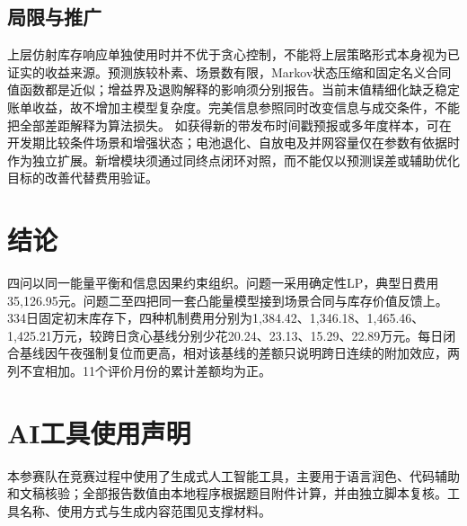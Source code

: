 \documentclass[UTF8,a4paper,zihao=-4,fontset=mac]{ctexart}
\begin{document}
\subsection{局限与推广}
上层仿射库存响应单独使用时并不优于贪心控制，不能将上层策略形式本身视为已证实的收益来源。预测族较朴素、场景数有限，Markov状态压缩和固定名义合同值函数都是近似；增益界及退购解释的影响须分别报告。当前末值精细化缺乏稳定账单收益，故不增加主模型复杂度。完美信息参照同时改变信息与成交条件，不能把全部差距解释为算法损失。
如获得新的带发布时间戳预报或多年度样本，可在开发期比较条件场景和增强状态；电池退化、自放电及并网容量仅在参数有依据时作为独立扩展。新增模块须通过同终点闭环对照，而不能仅以预测误差或辅助优化目标的改善代替费用验证。
\section{结论}
四问以同一能量平衡和信息因果约束组织。问题一采用确定性LP，典型日费用35,126.95元。问题二至四把同一套凸能量模型接到场景合同与库存价值反馈上。334日固定初末库存下，四种机制费用分别为1,384.42、1,346.18、1,465.46、1,425.21万元，较跨日贪心基线分别少花20.24、23.13、15.29、22.89万元。每日闭合基线因午夜强制复位而更高，相对该基线的差额只说明跨日连续的附加效应，两列不宜相加。11个评价月份的累计差额均为正。

\section*{AI工具使用声明}
本参赛队在竞赛过程中使用了生成式人工智能工具，主要用于语言润色、代码辅助和文稿核验；全部报告数值由本地程序根据题目附件计算，并由独立脚本复核。工具名称、使用方式与生成内容范围见支撑材料。
\end{document}
